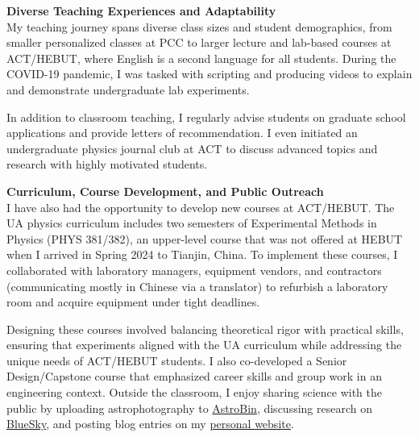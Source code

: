 \documentclass[11pt]{article}
\begin{document}
{\large\textbf{Diverse Teaching Experiences and Adaptability}}\\
My teaching journey spans diverse class sizes and student demographics, from smaller personalized classes at PCC to larger lecture and lab-based courses at ACT/HEBUT, where English is a second language for all students. During the COVID-19 pandemic, I was tasked with scripting and producing videos to explain and demonstrate undergraduate lab experiments. 

In addition to classroom teaching, I regularly advise students on graduate school applications and provide letters of recommendation. I even initiated an undergraduate physics journal club at ACT to discuss advanced topics and research with highly motivated students.

{\large\textbf{Curriculum, Course Development, and Public Outreach}}\\
I have also had the opportunity to develop new courses at ACT/HEBUT. The UA physics curriculum includes two semesters of Experimental Methods in Physics (PHYS 381/382), an upper-level course that was not offered at HEBUT when I arrived in Spring 2024 to Tianjin, China. To implement these courses, I collaborated with laboratory managers, equipment vendors, and contractors (communicating mostly in Chinese via a translator) to refurbish a laboratory room and acquire equipment under tight deadlines.

Designing these courses involved balancing theoretical rigor with practical skills, ensuring that experiments aligned with the UA curriculum while addressing the unique needs of ACT/HEBUT students. I also co-developed a Senior Design/Capstone course that emphasized career skills and group work in an engineering context. Outside the classroom, I enjoy sharing science with the public by uploading astrophotography to \href{https://www.astrobin.com/users/djinn/}{AstroBin}, discussing research on \href{https://bsky.app/profile/ajsteinmetz.com}{BlueSky}, and posting blog entries on my \href{https://ajsteinmetz.github.io/}{personal website}.
\end{document}
